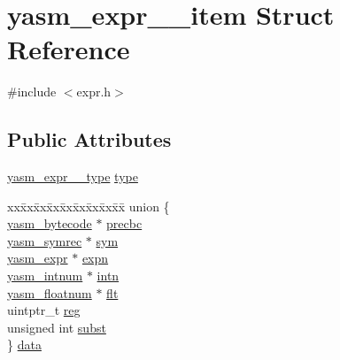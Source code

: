 \hypertarget{structyasm__expr____item}{\section{yasm\-\_\-expr\-\_\-\-\_\-item Struct Reference}
\label{structyasm__expr____item}
}


{\ttfamily \#include $<$expr.\-h$>$}

\subsection*{Public Attributes}
\begin{DoxyCompactItemize}
\item 
\hyperlink{expr_8h_a0b38be0745b4fdb9edd60a1698f7ca0b}{yasm\-\_\-expr\-\_\-\-\_\-type} \hyperlink{structyasm__expr____item_a267df87d11012e9046df717f33f413b0}{type}
\item 
\begin{tabbing}
xx\=xx\=xx\=xx\=xx\=xx\=xx\=xx\=xx\=\kill
union \{\\
\>\hyperlink{structyasm__bytecode}{yasm\_bytecode} $\ast$ \hyperlink{structyasm__expr____item_a8b0b9a18440fe185f304a45229ee5921}{precbc}\\
\>\hyperlink{structyasm__symrec}{yasm\_symrec} $\ast$ \hyperlink{structyasm__expr____item_a281ff29799f1620de3a1fb327c507c5f}{sym}\\
\>\hyperlink{structyasm__expr}{yasm\_expr} $\ast$ \hyperlink{structyasm__expr____item_a774cdf884a1590ccc1af42c90e04155f}{expn}\\
\>\hyperlink{structyasm__intnum}{yasm\_intnum} $\ast$ \hyperlink{structyasm__expr____item_a326176864071cb8e352077ca16e98b50}{intn}\\
\>\hyperlink{structyasm__floatnum}{yasm\_floatnum} $\ast$ \hyperlink{structyasm__expr____item_a1be033f053639350332156389e0dda43}{flt}\\
\>uintptr\_t \hyperlink{structyasm__expr____item_a397bae2de73a33c8913308ff90012329}{reg}\\
\>unsigned int \hyperlink{structyasm__expr____item_afd018d97c98b7b24cf695e70b1bf3871}{subst}\\
\} \hyperlink{structyasm__expr____item_a92f56293ae09d1ddd23c0f793759dedd}{data}\\

\end{tabbing}\end{DoxyCompactItemize}


